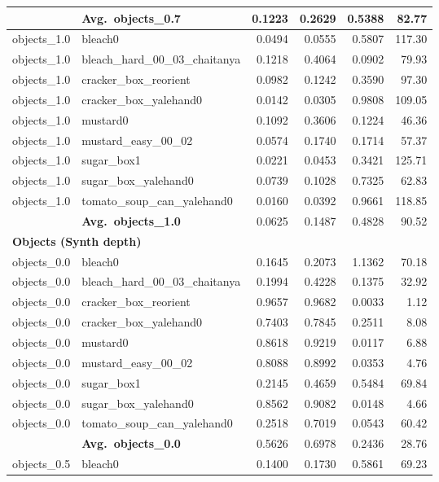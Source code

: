 \begin{longtable}{llrrrr}
  \cmidrule{2-6}
  & \textbf{Avg.~objects_0.7} & 0.1223 & 0.2629 & 0.5388 & 82.77 \\
  \midrule
  objects_1.0 & bleach0 & 0.0494 & 0.0555 & 0.5807 & 117.30 \\
  objects_1.0 & bleach\_hard\_00\_03\_chaitanya & 0.1218 & 0.4064 & 0.0902 & 79.93 \\
  objects_1.0 & cracker\_box\_reorient & 0.0982 & 0.1242 & 0.3590 & 97.30 \\
  objects_1.0 & cracker\_box\_yalehand0 & 0.0142 & 0.0305 & 0.9808 & 109.05 \\
  objects_1.0 & mustard0 & 0.1092 & 0.3606 & 0.1224 & 46.36 \\
  objects_1.0 & mustard\_easy\_00\_02 & 0.0574 & 0.1740 & 0.1714 & 57.37 \\
  objects_1.0 & sugar\_box1 & 0.0221 & 0.0453 & 0.3421 & 125.71 \\
  objects_1.0 & sugar\_box\_yalehand0 & 0.0739 & 0.1028 & 0.7325 & 62.83 \\
  objects_1.0 & tomato\_soup\_can\_yalehand0 & 0.0160 & 0.0392 & 0.9661 & 118.85 \\
  \cmidrule{2-6}
  & \textbf{Avg.~objects_1.0} & 0.0625 & 0.1487 & 0.4828 & 90.52 \\
  \midrule
\multicolumn{6}{l}{\textbf{Objects (Synth depth)}} \\
\midrule
  objects_0.0 & bleach0 & 0.1645 & 0.2073 & 1.1362 & 70.18 \\
  objects_0.0 & bleach\_hard\_00\_03\_chaitanya & 0.1994 & 0.4228 & 0.1375 & 32.92 \\
  objects_0.0 & cracker\_box\_reorient & 0.9657 & 0.9682 & 0.0033 & 1.12 \\
  objects_0.0 & cracker\_box\_yalehand0 & 0.7403 & 0.7845 & 0.2511 & 8.08 \\
  objects_0.0 & mustard0 & 0.8618 & 0.9219 & 0.0117 & 6.88 \\
  objects_0.0 & mustard\_easy\_00\_02 & 0.8088 & 0.8992 & 0.0353 & 4.76 \\
  objects_0.0 & sugar\_box1 & 0.2145 & 0.4659 & 0.5484 & 69.84 \\
  objects_0.0 & sugar\_box\_yalehand0 & 0.8562 & 0.9082 & 0.0148 & 4.66 \\
  objects_0.0 & tomato\_soup\_can\_yalehand0 & 0.2518 & 0.7019 & 0.0543 & 60.42 \\
  \cmidrule{2-6}
  & \textbf{Avg.~objects_0.0} & 0.5626 & 0.6978 & 0.2436 & 28.76 \\
  \midrule
  objects_0.5 & bleach0 & 0.1400 & 0.1730 & 0.5861 & 69.23 \\

\end{longtable}
